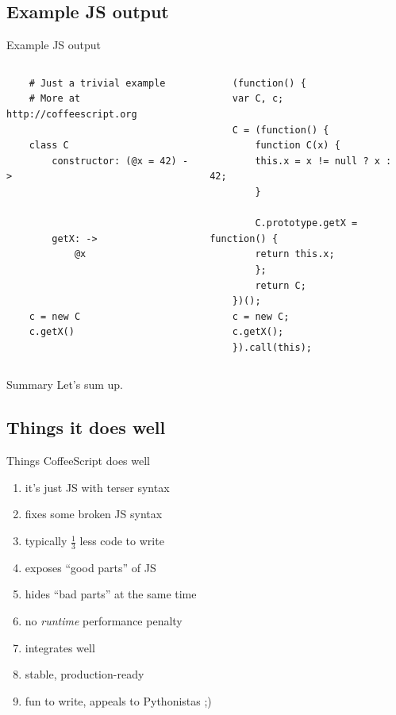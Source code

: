 \documentclass[xcolor=dvipsnames]{beamer}
\newcommand{\slide}[1]{\begin{frame}[fragile]{{#1}}}
\newcommand{\coffee}{\begin{verbatim}}
\newcommand{\js}{\begin{verbatim}}
\begin{document}
\subsection{Example JS output}
%----------------------------------
\slide{Example JS output}

\begin{columns}[t]
% remember \coffeescript command gobbles 4 spaces only
\column{5.5cm}
\begin{footnotesize}
    \coffee
    # Just a trivial example
    # More at http://coffeescript.org

    class C
        constructor: (@x = 42) ->



        getX: ->
            @x



    c = new C
    c.getX()
    \end{verbatim}
\end{footnotesize}

\pause

\column{5.5cm}
\begin{footnotesize}
    \js
    (function() {
    var C, c;

    C = (function() {
        function C(x) {
        this.x = x != null ? x : 42;
        }

        C.prototype.getX = function() {
        return this.x;
        };
        return C;
    })();
    c = new C;
    c.getX();
    }).call(this);
    \end{verbatim}
\end{footnotesize}

\end{columns}
\end{frame}


\slide{Summary}
    Let's sum up.
\end{frame}


\subsection{Things it does well}
\slide{Things CoffeeScript does well}
    \begin{enumerate}
        \item it's just JS with terser syntax
        \item fixes some broken JS syntax
        \item typically $\frac{1}{3}$ less code to write
        \item exposes ``good parts'' of JS
        \item hides ``bad parts'' at the same time
        \item no \emph{runtime} performance penalty
        \item integrates well
        \item stable, production-ready
        \item fun to write, appeals to Pythonistas ;)
    \end{enumerate}
\end{frame}
\end{document}

